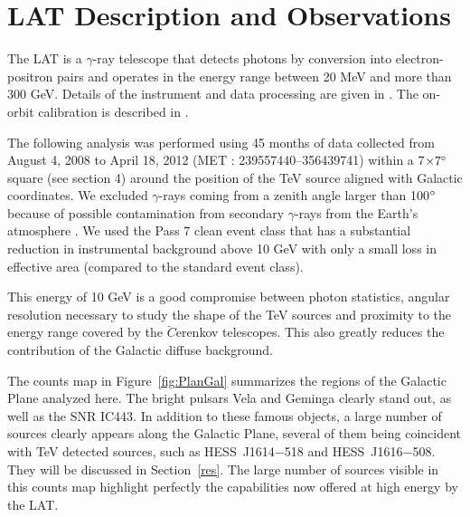 \section{LAT Description and Observations}

The LAT is a $\gamma$-ray telescope that detects photons by conversion into electron-positron pairs and operates in the energy range between 20 MeV and more than 300 GeV. Details of the instrument and data processing are given in \cite{2009ApJ...697.1071A}. The on-orbit calibration is described in \cite{2009ApJ...696.1084A}.

The following analysis was performed using 45 months of data collected from August 4, 2008 to April 18, 2012 (MET : 239557440--356439741) within a $7$\degr $\times 7\mbox{$^\circ$}$ square (see section 4) around the position of the TeV source aligned with Galactic coordinates. We excluded $\gamma$-rays coming from a zenith angle larger than 100$\mbox{$^\circ$}$ because of possible contamination from secondary $\gamma$-rays from the Earth's atmosphere \citep{2009PhRvD..80l2004A}. We used the Pass 7 clean event class that has a substantial reduction in instrumental background above 10 GeV with only a small loss in effective area (compared to the standard event class).

This energy of 10 GeV is a good compromise between photon statistics, angular resolution necessary to study the shape of the TeV sources and proximity to the energy range covered by the $\breve{C}$erenkov telescopes. This also greatly reduces the contribution of the Galactic diffuse background.

The counts map in Figure~\ref{fig:PlanGal} summarizes the regions of the Galactic Plane analyzed here. The bright pulsars Vela and Geminga clearly stand out, as well as the SNR IC443. In addition to these famous objects, a large number of sources clearly appears along the Galactic Plane, several of them being coincident with TeV detected sources, such as HESS~J1614$-$518 and HESS~J1616$-$508. They will be discussed in Section~\ref{res}. The large number of sources visible in this counts map highlight perfectly the capabilities now offered at high energy by the LAT.




